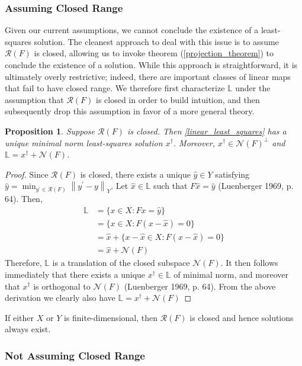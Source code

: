\documentclass[12pt]{article}
\newcommand*{\norm}[1]{\left\lVert#1\right\rVert}
\newcommand{\R}{\mathcal{R}}
\newcommand{\N}{\mathcal{N}}
\newtheorem{prop}{Proposition}
\begin{document}
\subsubsection{Assuming Closed Range}

Given our current assumptions, we cannot conclude the existence of a least-squares solution. The cleanest approach to deal with this 
issue is to assume $\R(F)$ is closed, allowing us to invoke theorem (\ref{projection_theorem}) to conclude the existence of a solution. While this 
approach is straightforward, it is ultimately overly restrictive; indeed, there are important classes of linear maps that fail to have closed 
range. We therefore first characterize $\mathbb{L}$ under the assumption that $\R(F)$ is closed in order to build intuition, and then 
subsequently drop this assumption in favor of a more general theory. 
 
 \begin{prop}
 Suppose $\R(F)$ is closed. Then \eqref{linear_least_squares} has a unique minimal norm least-squares solution $x^\dagger$. Moreover, 
 $x^\dagger \in \N(F)^\perp$ and  $\mathbb{L} = x^\dagger + \N(F)$.
 \end{prop} 
 
\begin{proof} 
Since $\R(F)$ is closed, there exists a unique $\hat{y} \in Y$ satisfying $\hat{y} = \min_{y^\prime \in \R(F)} \norm{y^\prime - y}_{Y}$. Let $\hat{x} \in \mathbb{L}$ such that $F\hat{x} = \hat{y}$ (Luenberger 1969, p. 64). Then, 
 \begin{align*} 
 \mathbb{L} &= \{x \in X: Fx = \hat{y}\} \\
                   &= \{x \in X: F(x - \hat{x}) = 0\} \\
                   &= \hat{x} + \{x - \hat{x} \in X: F(x - \hat{x}) = 0\} \\
                   &= \hat{x} + \N(F)
 \end{align*} 
 Therefore, $ \mathbb{L}$ is a translation of the closed subspace $\N(F)$. It then follows immediately that there exists a unique $x^\dagger \in \mathbb{L}$ of minimal norm, and moreover that $x^\dagger$ is orthogonal to $\N(F)$ (Luenberger 1969, p. 64). From the above derivation we clearly also have $\mathbb{L} = x^\dagger + \N(F)$
\end{proof} 

If either $X$ or $Y$ is finite-dimensional, then $\R(F)$ is closed and hence solutions always exist. 

\subsubsection{Not Assuming Closed Range}
\end{document}
